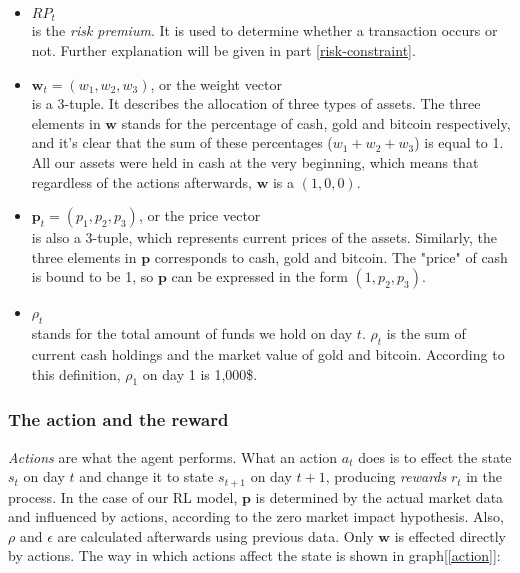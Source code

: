 \documentclass{mcmthesis}
\begin{document}
\begin{itemize}
  \item $RP_t$ \\
  is the \textit{risk premium}.
  It is used to determine whether a transaction occurs or not.
  Further explanation will be given in part \ref{risk-constraint}.

  \item $\pmb{w}_t = (w_1, w_2, w_3)$, or the weight vector \\ is a 3-tuple.
  It describes the allocation of three types of assets.
  The three elements in $\pmb{w}$ stands for the percentage of cash, gold and bitcoin respectively,
  and it's clear that the sum of these percentages ($w_1+w_2+w_3$) is equal to 1.\\
  All our assets were held in cash at the very beginning,
  which means that regardless of the actions afterwards,
  $\pmb{w}$ is a $(1,0,0)$.

  \item $\pmb{p}_t = (p_1, p_2, p_3)$, or the price vector \\ is also a 3-tuple,
  which represents current prices of the assets.
  Similarly, the three elements in $\pmb{p}$ corresponds to cash, gold and bitcoin.
  The "price" of cash is bound to be 1,
  so $\pmb{p}$ can be expressed in the form $(1,p_2,p_3)$.

  \item $\rho_t$\\
  stands for the total amount of funds we hold on day $t$.
  $\rho _t$ is the sum of current cash holdings and the market value of gold and bitcoin.
  According to this definition, $\rho _1$ on day 1 is 1,000\$.
\end{itemize}

\subsubsection{The action and the reward}

\textit{Actions} are what the agent performs.
What an action $a_t$ does is to effect the state $s_t$ on day $t$
and change it to state $s_{t+1}$ on day $t+1$,
producing \textit{rewards} $r_t$ in the process.
In the case of our RL model,
$\pmb{p}$ is determined by the actual market data and influenced by actions,
according to the zero market impact hypothesis.
Also, $\rho $ and $\epsilon$ are calculated afterwards using previous data.
Only $\pmb{w}$ is effected directly by actions.
The way in which actions affect the state is shown in graph[\ref{action}]:
\end{document}
